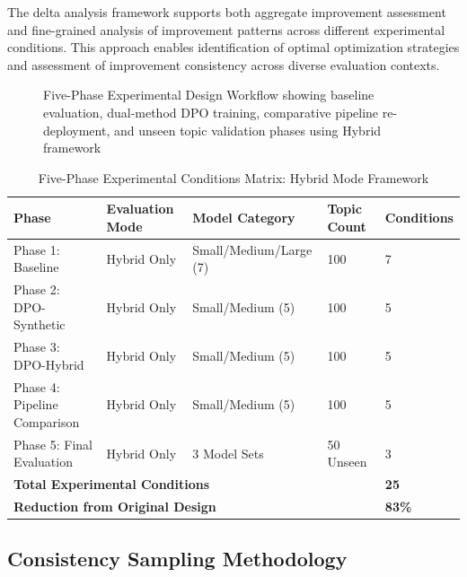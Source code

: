 The delta analysis framework supports both aggregate improvement assessment and fine-grained analysis of improvement patterns across different experimental conditions. This approach enables identification of optimal optimization strategies and assessment of improvement consistency across diverse evaluation contexts.

\begin{figure}[htbp]
    \centering
    \caption{Five-Phase Experimental Design Workflow showing baseline evaluation, dual-method DPO training, comparative pipeline re-deployment, and unseen topic validation phases using Hybrid framework}
    \label{fig:five-phase-design}
\end{figure}

\begin{table}[htbp]
    \centering
    \caption{Five-Phase Experimental Conditions Matrix: Hybrid Mode Framework}
    \label{tab:experimental-conditions}
    \begin{tabular}{|l|l|l|l|l|}
    \hline
    \textbf{Phase} & \textbf{Evaluation Mode} & \textbf{Model Category} & \textbf{Topic Count} & \textbf{Conditions} \\
    \hline
    Phase 1: Baseline & Hybrid Only & Small/Medium/Large (7) & 100 & 7 \\
    Phase 2: DPO-Synthetic & Hybrid Only & Small/Medium (5) & 100 & 5 \\
    Phase 3: DPO-Hybrid & Hybrid Only & Small/Medium (5) & 100 & 5 \\
    Phase 4: Pipeline Comparison & Hybrid Only & Small/Medium (5) & 100 & 5 \\
    Phase 5: Final Evaluation & Hybrid Only & 3 Model Sets & 50 Unseen & 3 \\
    \hline
    \multicolumn{4}{|l|}{\textbf{Total Experimental Conditions}} & \textbf{25} \\
    \multicolumn{4}{|l|}{\textbf{Reduction from Original Design}} & \textbf{83\%} \\
    \hline
    \end{tabular}
\end{table}

\subsection{Consistency Sampling Methodology}

